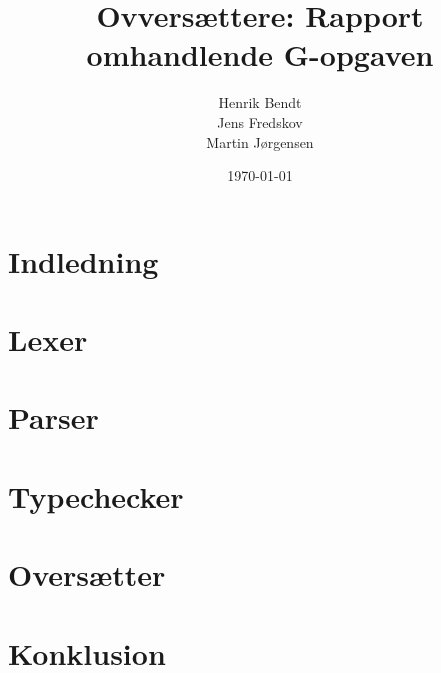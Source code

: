 \documentclass[a2paper, 10pt]{article}
\author{Henrik Bendt \\ Jens Fredskov \\ Martin Jørgensen}
\title{Ovversættere: Rapport omhandlende G-opgaven}
\date{\today}
\begin{document}
\maketitle
\pagebreak

\section{Indledning}

\section{Lexer}

\section{Parser}

\section{Typechecker}

\section{Oversætter}

\section{Konklusion}
\end{document}
